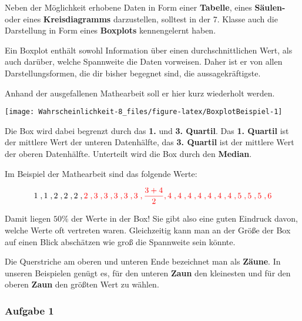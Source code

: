 \documentclass[
  ngerman,
]{book}
\begin{document}
Neben der Möglichkeit erhobene Daten in Form einer \textbf{Tabelle}, eines \textbf{Säulen-} oder eines \textbf{Kreisdiagramms} darzustellen, solltest in der 7. Klasse auch die Darstellung in Form eines \textbf{Boxplots} kennengelernt haben.

Ein Boxplot enthält sowohl Information über einen durchschnittlichen Wert, als auch darüber, welche Spannweite die Daten vorweisen. Daher ist er von allen Darstellungsformen, die dir bisher begegnet sind, die aussagekräftigste.

Anhand der ausgefallenen Mathearbeit soll er hier kurz wiederholt werden.

\begin{center}\texttt{[image: Wahrscheinlichkeit-8\_files/figure-latex/BoxplotBeispiel-1]} \end{center}

Die Box wird dabei begrenzt durch das \textbf{1.} und \textbf{3. Quartil}. Das \textbf{1. Quartil} ist der mittlere Wert der unteren Datenhälfte, das \textbf{3. Quartil} ist der mittlere Wert der oberen Datenhälfte. Unterteilt wird die Box durch den \textbf{Median}.

Im Beispiel der Mathearbeit sind das folgende Werte:

\[1\;,1\;,2\;,2\;,2\;,\color{red}{2}\;,3\;,3\;,3\;,3\;,3\;,\color{red}{\frac{3+4}{2}},4\;,4\;,4\;,4\;,4\;,\color{red}{4}\;,4\;,5\;,5\;,5\;,6\]

Damit liegen \(50\%\) der Werte in der Box! Sie gibt also eine guten Eindruck davon, welche Werte oft vertreten waren. Gleichzeitig kann man an der Größe der Box auf einen Blick abschätzen wie groß die Spannweite sein könnte.

Die Querstriche am oberen und unteren Ende bezeichnet man als \textbf{Zäune}. In unseren Beispielen genügt es, für den unteren \textbf{Zaun} den kleinesten und für den oberen \textbf{Zaun} den größten Wert zu wählen.

\hypertarget{section-29}{%
\subsubsection*{}\label{section-29}}

\hypertarget{aufgabe-1-4}{%
\subsubsection*{Aufgabe 1}\label{aufgabe-1-4}}
\end{document}
